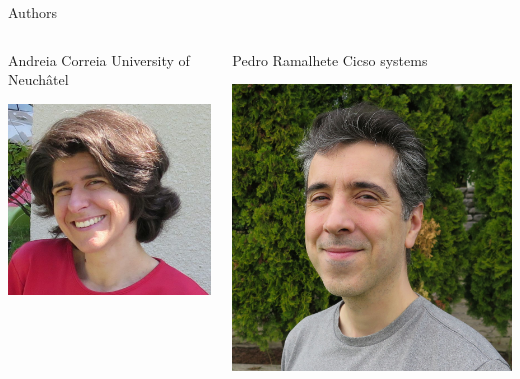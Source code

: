 \documentclass[presentation]{beamer}
\begin{document}
\begin{frame}[label={sec:org103b257}]{Authors}
\begin{block}{}
\begin{columns}
\begin{column}{0.2\columnwidth}
\begin{block}{Andreia Correia}
University of Neuchâtel\\
\begin{center}
\includegraphics[width=.9\linewidth]{./IMGs/andreia.jpg}
\end{center}
\end{block}
\end{column}
\begin{column}{0.2\columnwidth}
\begin{block}{Pedro Ramalhete}
Cicso systems\\
\begin{center}
\includegraphics[width=.9\linewidth]{./IMGs/pedro.jpg}
\end{center}
\end{block}
\end{column}
\end{columns}
\end{block}


\end{frame}
\end{document}

